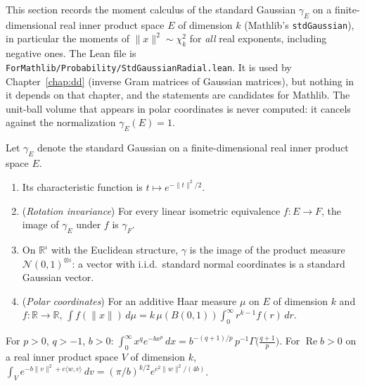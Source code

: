 This section records the moment calculus of the standard Gaussian $\gamma_E$ on a finite-dimensional real inner product space $E$ of dimension $k$
(Mathlib's \texttt{stdGaussian}), in particular the moments of $\|x\|^2\sim\chi^2_k$ for \emph{all} real exponents, including negative ones. The Lean file is
\texttt{ForMathlib/Probability/StdGaussianRadial.lean}. It is used by Chapter~\ref{chap:dd} (inverse Gram matrices of Gaussian matrices), but nothing in it depends on
that chapter, and the statements are candidates for Mathlib. The unit-ball volume that appears in polar coordinates is never computed: it cancels against the normalization
$\gamma_E(E)=1$.

\begin{lemma}\label{lem:ntkf:mathlibGaussian}
  \mathlibok
Let $\gamma_E$ denote the standard Gaussian on a finite-dimensional real inner product space $E$.
\begin{enumerate}
  \item Its characteristic function is $t\mapsto e^{-\|t\|^2/2}$.
  \item (\emph{Rotation invariance}) For every linear isometric equivalence $f:E\to F$, the image of $\gamma_E$ under $f$ is $\gamma_F$.
  \item On $\mathbb R^\iota$ with the Euclidean structure, $\gamma$ is the image of the product measure $\mathcal N(0,1)^{\otimes\iota}$:
  a vector with i.i.d.\ standard normal coordinates is a standard Gaussian vector.
  \item (\emph{Polar coordinates}) For an additive Haar measure $\mu$ on $E$ of dimension $k$ and $f:\mathbb R\to\mathbb R$,
  $\int f(\|x\|)\,d\mu=k\,\mu(B(0,1))\int_0^\infty r^{k-1}f(r)\,dr$.
\end{enumerate}
\end{lemma}

\begin{lemma}\label{lem:ntkf:mathlibGamma}
  \mathlibok
For $p>0$, $q>-1$, $b>0$: $\int_0^\infty x^qe^{-bx^p}\,dx=b^{-(q+1)/p}\,p^{-1}\Gamma\bigl(\tfrac{q+1}p\bigr)$. For $\operatorname{Re}b>0$ on a real
inner product space $V$ of dimension $k$, $\int_Ve^{-b\|v\|^2+c\langle w,v\rangle}\,dv=(\pi/b)^{k/2}e^{c^2\|w\|^2/(4b)}$.
\end{lemma}

